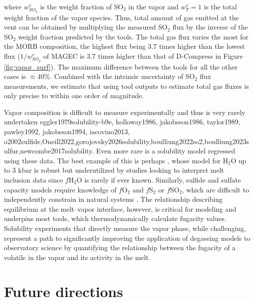\documentclass[draft, english]{volcanica-template}
\begin{document}
where $w_{SO_2}^v$ is the weight fraction of SO$_2$ in the vapor and $w_T^v=1$ is the total weight fraction of the vapor species. Thus, total amount of gas emitted at the vent can be obtained by multiplying the measured SO$_2$ flux by the inverse of the SO$_2$ weight fraction predicted by the tools. The total gas flux varies the most for the MORB composition, the highest flux being 3.7 times higher than the lowest flux ($1/w_{SO_2}^v$ of MAGEC is 3.7 times higher than that of D-Compress in Figure \ref{fig:vapor_surf}). The maximum difference between the tools for all the other cases is $\approx 40\%$. Combined with the intrinsic uncertainty of SO$_2$ flux measurements, we estimate that using tool outputs to estimate total gas fluxes is only precise to within one order of magnitude. 

Vapor composition is difficult to measure experimentally and thus is very rarely undertaken {eggler1979solubility-b9e, holloway1986, jakobsson1986, taylor1989, pawley1992, jakobsson1994, iacovino2013, o2002sulfide,Oneill2022,gorojovsky2026solubility,boulliung2022so2,boulliung2023sulfur,newcombe2017solubility}. Even more rare is a solubility model regressed using these data. The best example of this is perhaps \textcite{Moore1998}, whose model for H$_2$O up to 3 kbar is robust but underutilized by studies looking to interpret melt inclusion data since $f$H$_2$O is rarely if ever known. Similarly, sulfide and sulfate capacity models require knowledge of $f$O$_2$ and $f$S$_2$ or $f$SO$_2$, which are difficult to independently constrain in natural systems \parencite{ONeill2021,Oneill2022,boulliung2022so2,boulliung2023sulfur,thomas-wood2026,gorojovsky2026solubility}. The relationship describing equilibrium at the melt–vapor interface, however, is critical for modeling and underpins most tools, which thermodynamically calculate fugacity values. Solubility experiments that directly measure the vapor phase, while challenging, represent a path to significantly improving the application of degassing models to observatory science by quantifying the relationship between the fugacity of a volatile in the vapor and its activity in the melt.

\section{Future directions}
\label{sec:futuremodel} 
\end{document}

